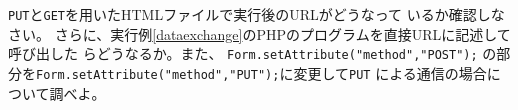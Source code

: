 \begin{Prob}\upshape\Must
 \texttt{PUT}と\texttt{GET}を用いたHTMLファイルで実行後のURLがどうなって
 いるか確認しなさい。
 さらに、実行例\ref{dataexchange}のPHPのプログラムを直接URLに記述して呼び出した
 らどうなるか。また、
   \Verb+Form.setAttribute("method","POST");+
 の部分を\Verb+Form.setAttribute("method","PUT");+に変更して\texttt{PUT}
 による通信の場合について調べよ。
\end{Prob}
